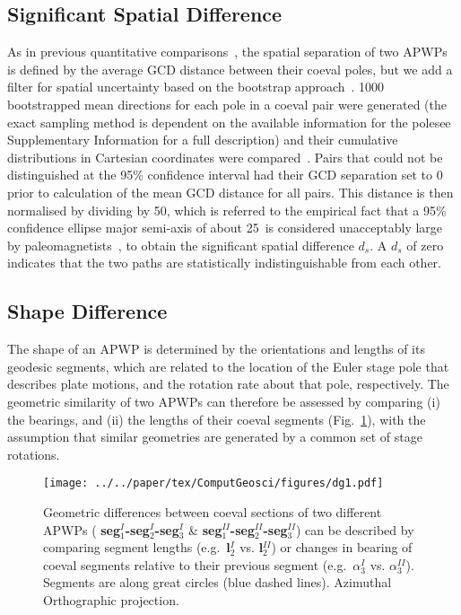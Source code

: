 \subsection{Significant Spatial Difference}\label{sec:sigDs}

As in previous quantitative comparisons~\cite[for example]{S07,T08}, the spatial
separation of two APWPs is defined by the average GCD distance between their
coeval poles, but we add a filter for spatial uncertainty based on the bootstrap
approach~\cite{T91}. 1000 bootstrapped mean directions for each pole in a
coeval pair were generated (the exact sampling method is dependent on the
available information for the pole\textemdash{}see Supplementary Information for
a full description) and their cumulative distributions in Cartesian coordinates
were compared~\cite{T91}. Pairs that could not be distinguished at the
95\% confidence interval had their GCD separation set to 0 prior to calculation
of the mean GCD distance for all pairs. This distance is then normalised by
dividing by 50\degree, which is referred to the empirical fact that a 95\%
confidence ellipse major semi-axis of about 25\degree\ is considered unacceptably
large by paleomagnetists~\cite{B92}, to obtain the significant spatial
difference $d_s$. A $d_s$ of zero indicates that the two paths are statistically
indistinguishable from each other.

\subsection{Shape Difference}

The shape of an APWP is determined by the orientations and lengths of its
geodesic segments, which are related to the location of the Euler stage pole
that describes plate motions, and the rotation rate about that pole,
respectively. The geometric similarity of two APWPs can therefore be assessed
by comparing (i) the bearings, and (ii) the lengths of their coeval segments
(Fig.~\ref{fig:direcdiff}), with the assumption that similar geometries are
generated by a common set of stage rotations.

\begin{figure}[tbp]
\texttt{[image: ../../paper/tex/ComputGeosci/figures/dg1.pdf]}
\caption[Geometric difference definition between two APWPs]{Geometric
differences between coeval sections of two different APWPs ({\bf
seg$_1^I$-seg$_2^I$-seg$_3^I$} \& {\bf seg$_1^{II}$-seg$_2^{II}$-seg$_3^{II}$})
can be described by comparing segment lengths (e.g.\ {\bf l$_2^I$} vs. {\bf
l$_2^{II}$}) or changes in bearing of coeval segments relative to their
previous segment (e.g.\ {\bf $\alpha_3^I$} vs. {\bf $\alpha_3^{II}$}). Segments
are along great circles (blue dashed lines). Azimuthal Orthographic
projection.}\label{fig:direcdiff}
\end{figure}

